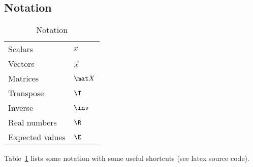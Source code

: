 \documentclass[12pt,twoside]{article}
\begin{document}
	\subsection{Notation}
	\begin{table}[tb]
		\caption{Notation}
		\label{tab:notation}
		\centering
		\begin{tabular}{ll}
			Scalars & $x$\\
			Vectors & $\vec x$\\
			Matrices & $\mat X$\\
			Transpose & $\T$\\
			Inverse & $\inv$\\
			Real numbers & $\R$\\
			Expected values & $\E$\\
		\end{tabular}
	\end{table}
	Table~\ref{tab:notation} lists some notation with some useful shortcuts (see latex source code).
	
\end{document}
